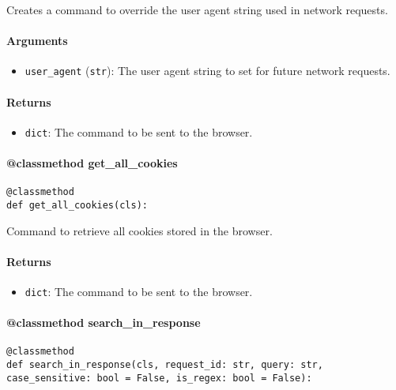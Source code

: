 \documentclass{article}
\begin{document}
\noindent Creates a command to override the user agent string used in network requests.

\paragraph{Arguments}

\begin{itemize}
    \item \lstinline[style=pythonstyle]|user_agent| (\lstinline[style=pythonstyle]|str|): The user agent string to set for future network requests.
\end{itemize}

\paragraph{Returns}

\begin{itemize}
    \item \lstinline[style=pythonstyle]|dict|: The command to be sent to the browser.
\end{itemize}

\paragraph{@classmethod get\_all\_cookies}

\begin{lstlisting}[style=pythonstyle]
@classmethod
def get_all_cookies(cls):
\end{lstlisting}

\noindent Command to retrieve all cookies stored in the browser.

\paragraph{Returns}

\begin{itemize}
    \item \lstinline[style=pythonstyle]|dict|: The command to be sent to the browser.
\end{itemize}

\paragraph{@classmethod search\_in\_response}

\begin{lstlisting}[style=pythonstyle]
@classmethod
def search_in_response(cls, request_id: str, query: str, case_sensitive: bool = False, is_regex: bool = False):
\end{lstlisting}
\end{document}
